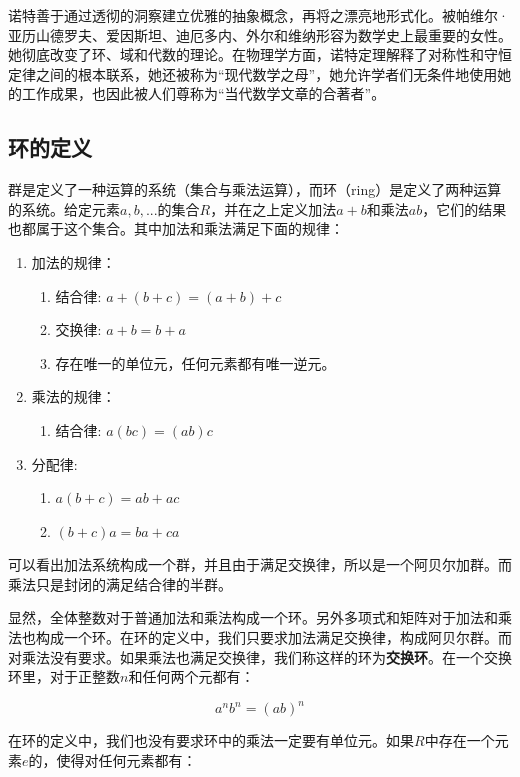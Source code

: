 \documentclass[b5paper]{ctexart}
\begin{document}
诺特善于通过透彻的洞察建立优雅的抽象概念，再将之漂亮地形式化。被帕维尔·亚历山德罗夫、爱因斯坦、迪厄多内、外尔和维纳形容为数学史上最重要的女性。她彻底改变了环、域和代数的理论。在物理学方面，诺特定理解释了对称性和守恒定律之间的根本联系，她还被称为“现代数学之母”，她允许学者们无条件地使用她的工作成果，也因此被人们尊称为“当代数学文章的合著者”\cite{Wiki-Noether}。

\subsection{环的定义}
群是定义了一种运算的系统（集合与乘法运算），而环（ring）是定义了两种运算的系统。给定元素$a, b, ...$的集合$R$，并在之上定义加法$a+b$和乘法$ab$，它们的结果也都属于这个集合。其中加法和乘法满足下面的规律：

\begin{enumerate}
\item 加法的规律：
  \begin{enumerate}
  \item 结合律: $a + (b + c) = (a + b) + c$
  \item 交换律: $a + b = b + a$
  \item 存在唯一的单位元，任何元素都有唯一逆元。
  \end{enumerate}
\item 乘法的规律：
  \begin{enumerate}
  \item 结合律: $a(bc) = (ab)c$
  \end{enumerate}
\item 分配律:
  \begin{enumerate}
  \item $a(b + c) = ab + ac$
  \item $(b + c)a = ba + ca$
  \end{enumerate}
\end{enumerate}

可以看出加法系统构成一个群，并且由于满足交换律，所以是一个阿贝尔加群。而乘法只是封闭的满足结合律的半群。

显然，全体整数对于普通加法和乘法构成一个环。另外多项式和矩阵对于加法和乘法也构成一个环。在环的定义中，我们只要求加法满足交换律，构成阿贝尔群。而对乘法没有要求。如果乘法也满足交换律，我们称这样的环为\textbf{交换环}。在一个交换环里，对于正整数$n$和任何两个元都有：

\[
a^nb^n = (ab)^n
\]

在环的定义中，我们也没有要求环中的乘法一定要有单位元。如果$R$中存在一个元素$e$的，使得对任何元素都有：
\end{document}
